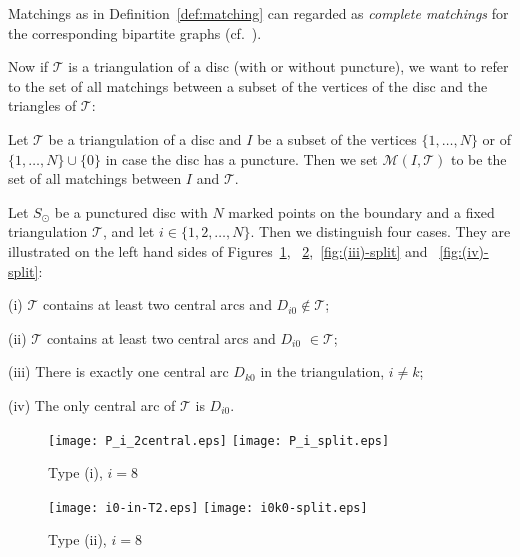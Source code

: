 \documentclass[a4paper]{amsart}
\begin{document}
\begin{remark}
Matchings as in Definition~\ref{def:matching} can regarded as
\emph{complete matchings} for the corresponding bipartite graphs
(cf.~\cite[11-1]{grimaldi85}).
\end{remark}

Now if ${\mathcal T}$ is a triangulation of a disc (with or without puncture),
we want to refer to the set of all matchings between a subset of
the vertices of the disc and the triangles of ${\mathcal T}$:
\begin{definition}\label{def:matching-set}
Let ${\mathcal T}$ be a triangulation of a disc and $I$ be a subset of
the vertices $\{1,\dots,N\}$ or of  $\{1,\dots,N\}\cup\{0\}$ in case
the disc has a
puncture. Then we set
${\mathcal M}(I,{\mathcal T})$ to be the set of all matchings between $I$ and ${\mathcal T}$.
\end{definition}

\begin{remark}
Let $S_{\odot}$ be a punctured disc with $N$ marked points
on the boundary and a fixed triangulation ${\mathcal T}$, and 
let $i\in\{1,2,\dots,N\}$. Then we distinguish
four cases. They are illustrated on the left hand
sides of Figures~\ref{fig:(i)-split},
~\ref{fig:(ii)-split},~\ref{fig:(iii)-split} and
~\ref{fig:(iv)-split}:

(i) ${\mathcal T}$ contains at least two central arcs
and $D_{i0}\notin{\mathcal T}$;

(ii) ${\mathcal T}$ contains at least two central arcs and
$D_{i0}$ $\in{\mathcal T}$;

(iii) There is exactly one central arc $D_{k0}$ in the
triangulation, $i\neq k$;

(iv) The only central arc of ${\mathcal T}$ is $D_{i0}$.
\end{remark}

\begin{figure}
\subfigure
{\texttt{[image: P\_i\_2central.eps]}\label{fig:P_i_2central}}
\hspace{1cm}
\subfigure
{\texttt{[image: P\_i\_split.eps]}\label{fig:P_i_split}}
\caption{Type (i), $i=8$}\label{fig:(i)-split}
\end{figure}

\begin{figure}
\subfigure
{\texttt{[image: i0-in-T2.eps]}\label{fig:i0-in-T2}}
\hspace{1cm}
\subfigure
{\texttt{[image: i0k0-split.eps]}\label{fig:i0k0-split}}
\caption{Type (ii), $i=8$}\label{fig:(ii)-split}
\end{figure}
\end{document}

